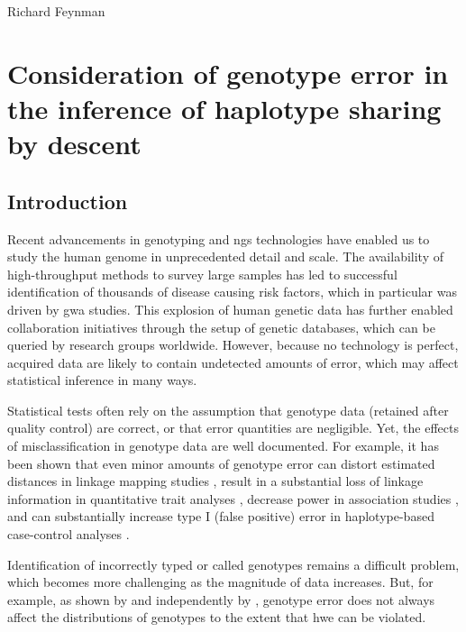 
\glsresetall


{Richard Feynman}

{
\singlespacing
\chapter{Consideration of genotype error in the inference of haplotype sharing by descent}
\label{ch:generr}
\minitoc
}


%
\section{Introduction}
%

Recent advancements in genotyping and \gls{ngs} technologies have enabled us to study the human genome in unprecedented detail and scale.
The availability of high-throughput methods to survey large samples has led to successful identification of thousands of disease causing risk factors, which in particular was driven by \gls{gwa} studies.
This explosion of human genetic data has further enabled collaboration initiatives through the setup of genetic databases, which can be queried by research groups worldwide.
However, because no technology is perfect, acquired data are likely to contain undetected amounts of error, which may affect statistical inference in many ways.

Statistical tests often rely on the assumption that genotype data (retained after quality control) are correct, or that error quantities are negligible.
Yet, the effects of misclassification in genotype data are well documented.
For example, it has been shown that even minor amounts of genotype error can distort estimated distances in linkage mapping studies \citep{Buetow:1991wc,Shields:1991uw,Sobel:2002}, result in a substantial loss of linkage information in quantitative trait analyses \citep{Douglas:2000hb,Abecasis:2001jp}, decrease power in association studies \citep{Kang:2004hy}, and can substantially increase type I (false positive) error in haplotype-based case-control analyses \citep{moskvina2005minor}.

Identification of incorrectly typed or called genotypes remains a difficult problem, which becomes more challenging as the magnitude of data increases.
But, for example, as shown by \citet{Cox:2006kv} and independently by \citet{Moskvina:2006fz},
genotype error  does not always affect the distributions of genotypes to the extent that \gls{hwe} can be violated.


